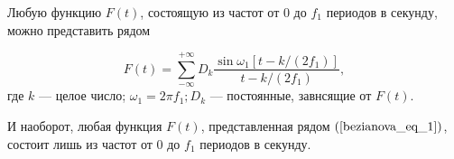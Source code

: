 \begin{theorem}\label{bezianova_theor_1} Любую функцию $F(t)$, состоящую из частот от 0 до $f_1$ периодов в секунду, можно представить рядом

\begin{equation}\label{bezianova_eq_1}
    F(t)=\sum_{-\infty}^{+\infty} D_k \frac{\sin \omega_1\left[t-k /\left(2 f_1\right)\right]}{t-k/\left(2 f_1\right)}, 
\end{equation}
где $k$ --- целое число; $\omega_1 = 2 \pi f_1 ; D_k$ --- постоянные, завнсящие от $F(t)$.

И наоборот, любая функция $F(t)$, представленная рядом $(\ref{bezianova_eq_1})$, состоит лишь из частот от 0 до $f_1$ периодов в секунду.

\end{theorem}

